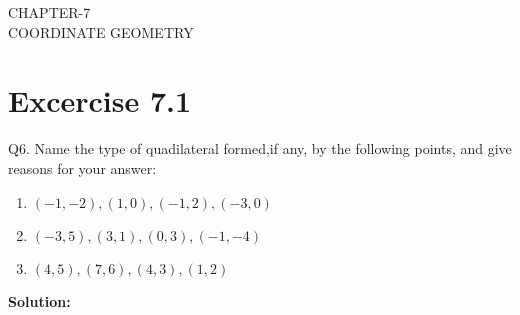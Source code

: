 \documentclass[12pt]{article}
\providecommand{\brak}[1]{\ensuremath{\left(#1\right)}}
\newcommand{\solution}{\noindent \textbf{Solution: }}
\begin{document}
\begin{center}
\textbf\large{CHAPTER-7 \\ COORDINATE GEOMETRY}

\end{center}
\section*{Excercise 7.1}

Q6. Name the type of quadilateral formed,if any, by the following points, and give reasons for your answer:
\begin{enumerate}
	\item $\brak{-1,-2}, \brak{1,0}, \brak{-1,2}, \brak{-3,0}$ 
	\item $\brak{-3,5}, \brak{3,1}, \brak{0,3}, \brak{-1,-4}$
	\item $\brak{4,5}, \brak{7,6}, \brak{4,3}, \brak{1,2}$
\end{enumerate}
\solution
\end{document}
